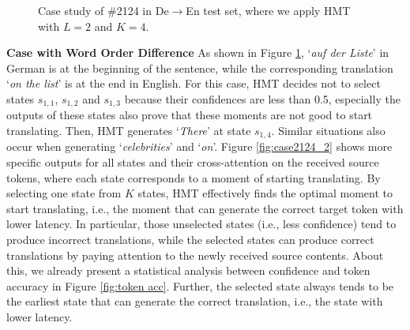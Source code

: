 \documentclass{article} %
\begin{document}
\begin{figure}[h]
\centering
{}
\caption{Case study of \#2124 in De$\rightarrow$En test set, where we apply HMT with $L\!=\!2$ and $K\!=\!4$.}
\label{fig:case2124}
\end{figure}

\textbf{Case with Word Order Difference} As shown in Figure \ref{fig:case2124}, `\textit{auf	der	Liste}' in German is at the beginning of the sentence, while the corresponding translation `\textit{on the list}' is at the end in English. For this case, HMT decides not to select states $s_{1,1}$, $s_{1,2}$ and $s_{1,3}$ because their confidences are less than 0.5, especially the outputs of these states also prove that these moments are not good to start translating. Then, HMT generates `\textit{There}' at state $s_{1,4}$. Similar situations also occur when generating `\textit{celebrities}' and `\textit{on}'. 
Figure \ref{fig:case2124_2} shows more specific outputs for all states and their cross-attention on the received source tokens, where each state corresponds to a moment of starting translating. By selecting one state from $K$ states, HMT effectively finds the optimal moment to start translating, i.e., the moment that can generate the correct target token with lower latency. In particular, those unselected states (i.e., less confidence) tend to produce incorrect translations, while the selected states can produce correct translations by paying attention to the newly received source contents. About this, we already present a statistical analysis between confidence and token accuracy in Figure \ref{fig:token acc}. Further, the selected state always tends to be the earliest state that can generate the correct translation, i.e., the state with lower latency.
\end{document}
